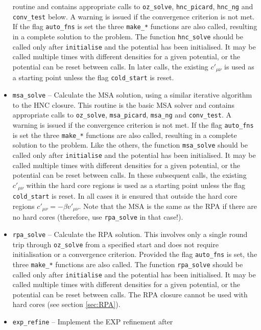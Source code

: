 \documentclass[12pt,a4paper]{article}
\begin{document}
\begin{itemize}
  routine and contains appropriate calls to \verb+oz_solve+,
  \verb+hnc_picard+, \verb+hnc_ng+ and \verb+conv_test+ below.  A
  warning is issued if the convergence criterion is not met.  If the
  flag \verb+auto_fns+ is set the three \verb+make_*+ functions are
  also called, resulting in a complete solution to the problem.  The
  function \verb+hnc_solve+ should be called only after
  \verb+initialise+ and the potential has been initialised.  It may be
  called multiple times with different densities for a given
  potential, or the potential can be reset between calls.  In
  later calls, the existing $c'_{\mu\nu}$ is used as a
  starting point unless the flag \verb+cold_start+ is reset.
%
\item\verb+msa_solve+ -- Calculate the MSA solution, using a similar
  iterative algorithm to the HNC closure. This routine is the basic
  MSA solver and contains appropriate calls to \verb+oz_solve+,
  \verb+msa_picard+, \verb+msa_ng+ and \verb+conv_test+.  A warning is
  issued if the convergence criterion is not met.  If the flag
  \verb+auto_fns+ is set the three \verb+make_*+ functions are also
  called, resulting in a complete solution to the problem.  Like the
  others, the function \verb+msa_solve+ should be called only after
  \verb+initialise+ and the potential has been initialised.  It may be
  called multiple times with different densities for a given
  potential, or the potential can be reset between calls.  In
  these subsequent calls, the existing $c'_{\mu\nu}$ within the hard
  core regions is used as a starting point unless the flag
  \verb+cold_start+ is reset. In all cases it is ensured that outside
  the hard core regions $c'_{\mu\nu}=-\beta v'_{\mu\nu}$. Note that the
  MSA is the same as the RPA if there are no hard cores (therefore, use
  \verb+rpa_solve+ in that case!).
%
\item\verb+rpa_solve+ -- Calculate the RPA solution.  This involves
  only a single round trip through \verb+oz_solve+ from a specified
  start and does not require initialisation or a convergence
  criterion.  Provided the flag \verb+auto_fns+ is set, the three
  \verb+make_*+ functions are also called. The function
  \verb+rpa_solve+ should be called only after \verb+initialise+ and
  the potential has been initialised.  It may be called multiple times
  with different densities for a given potential, or the potential can
  be reset between calls.  The RPA closure cannot be used with
  hard cores (see section \ref{sec:RPA}).
%
\item\verb+exp_refine+ -- Implement the EXP refinement after 

\end{itemize}
\end{document}
